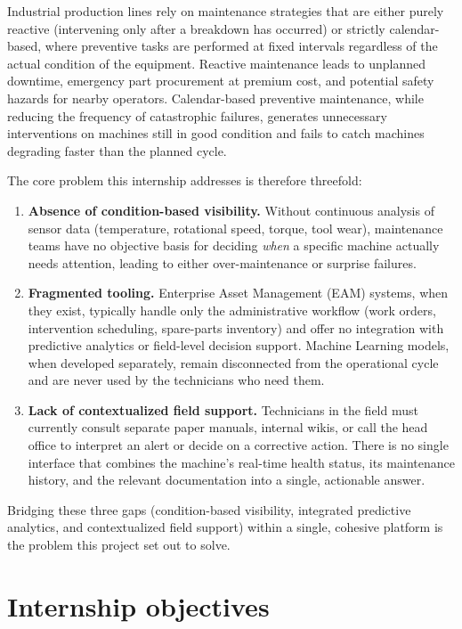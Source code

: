 Industrial production lines rely on maintenance strategies that are either purely reactive (intervening only after a breakdown has occurred) or strictly calendar-based, where preventive tasks are performed at fixed intervals regardless of the actual condition of the equipment. Reactive maintenance leads to unplanned downtime, emergency part procurement at premium cost, and potential safety hazards for nearby operators. Calendar-based preventive maintenance, while reducing the frequency of catastrophic failures, generates unnecessary interventions on machines still in good condition and fails to catch machines degrading faster than the planned cycle.

The core problem this internship addresses is therefore threefold:
\begin{enumerate}
\item \textbf{Absence of condition-based visibility.} Without continuous analysis of sensor data (temperature, rotational speed, torque, tool wear), maintenance teams have no objective basis for deciding \emph{when} a specific machine actually needs attention, leading to either over-maintenance or surprise failures.
\item \textbf{Fragmented tooling.} Enterprise Asset Management (EAM) systems, when they exist, typically handle only the administrative workflow (work orders, intervention scheduling, spare-parts inventory) and offer no integration with predictive analytics or field-level decision support. Machine Learning models, when developed separately, remain disconnected from the operational cycle and are never used by the technicians who need them.
\item \textbf{Lack of contextualized field support.} Technicians in the field must currently consult separate paper manuals, internal wikis, or call the head office to interpret an alert or decide on a corrective action. There is no single interface that combines the machine's real-time health status, its maintenance history, and the relevant documentation into a single, actionable answer.
\end{enumerate}

Bridging these three gaps (condition-based visibility, integrated predictive analytics, and contextualized field support) within a single, cohesive platform is the problem this project set out to solve.

\section{Internship objectives}
\label{sec:internship-objectives}

